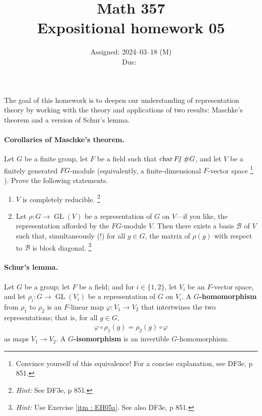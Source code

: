 \documentclass[oneside, english, 11pt]{article}
\title{Math 357\\Expositional homework 05}
\author{}
\date{Assigned: 2024--03--18 (M)\\Due: \hspace{1.5in}\,}
\newcommand{\fontDefWord}[1]{\textbf{#1}}
\newcommand{\fontHint}[1]{\emph{Hint:} #1}
\DeclareMathOperator{\characteristic}{char}
\newcommand{\divides}{\,|\,}
\DeclareMathOperator{\generalLinear}{GL}
\newcommand{\GL}{\generalLinear}
\newcommand{\notDivides}{{}\hspace{-1mm}{\not\hspace{-.15em}\divides{}}\,}
\newcommand{\order}{\#}
\begin{document}
\maketitle

The goal of this homework is to deepen our understanding of representation theory by working with the theory and applications of two results: Maschke's theorem and a version of Schur's lemma.

\paragraph{Corollaries of Maschke's theorem.}

Let $G$ be a finite group, let $F$ be a field such that $\characteristic F \notDivides \order G$, and let $V$ be a finitely generated $F G$-module (equivalently, a finite-dimensional $F$-vector space%
\footnote{Convince yourself of this equivalence! For a concise explanation, see DF3e, p 851.}%
). Prove the following statements.

\begin{enumerate}[label=(\alph*)]
\item\label{itm : EH05a} $V$ is completely reducible.%
\footnote{\fontHint{See DF3e, p 851.}}%
\item Let $\rho : G \rightarrow \GL(V)$ be a representation of $G$ on $V$---if you like, the representation afforded by the $F G$-module $V$. Then there exists a basis $\mathcal{B}$ of $V$ such that, simultaneously (!) for all $g \in G$, the matrix of $\rho(g)$ with respect to $\mathcal{B}$ is block diagonal.%
\footnote{\fontHint{Use Exercise \ref{itm : EH05a}. See also DF3e, p 851.}}%
\end{enumerate}

\paragraph{Schur's lemma.}

Let $G$ be a group; let $F$ be a field; and for $i \in \{1, 2\}$, let $V_{i}$ be an $F$-vector space, and let $\rho_{i} : G \rightarrow \GL(V_{i})$ be a representation of $G$ on $V_{i}$. A \fontDefWord{$G$-homomorphism} from $\rho_{1}$ to $\rho_{2}$ is an $F$-linear map $\varphi : V_{1} \rightarrow V_{2}$ that intertwines the two representations; that is, for all $g \in G$,
\begin{align*}
\varphi \circ \rho_{1}(g)
=
\rho_{2}(g) \circ \varphi
\end{align*}
as maps $V_{1} \rightarrow V_{2}$. A \fontDefWord{$G$-isomorphism} is an invertible $G$-homomorphism.
\end{document}
